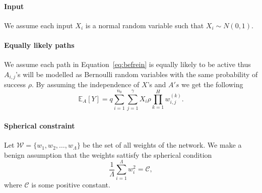 \documentclass[twoside]{article}
\begin{document}
\paragraph{Input}
We assume each input $X_i$ is a normal random variable such that $X_i\sim N(0,1)$. 

\paragraph{Equally likely paths}
We assume each path in Equation~\ref{eq:befrein} is equally likely to be active thus $A_{i,j}$'s will be modelled as Bernoulli random variables with the same probability of success $\rho$. By assuming the independence of $X$'s and $A's$ we get the following
\begin{equation}
\mathbb{E}_A[Y] = q\sum_{i=1}^{n_0}\sum_{j = 1}^\gamma X_{i}\rho\prod_{k = 1}^{H}w_{i,j}^{(k)}.
\label{eq:befrein2}
\end{equation}

\paragraph{Spherical constraint}
Let $\mathcal{W} = \{w_1,w_2,\dots,w_{\Lambda}\}$ be the set of all weights of the network. We make a benign assumption that the weights sattisfy the spherical condition 
\begin{equation}
\frac{1}{\Lambda}\sum_{i=1}^{\Lambda}w_i^2 = \mathcal{C},
\label{eq:befspherical}
\end{equation}
where $\mathcal{C}$ is some positive constant. 
\end{document}
